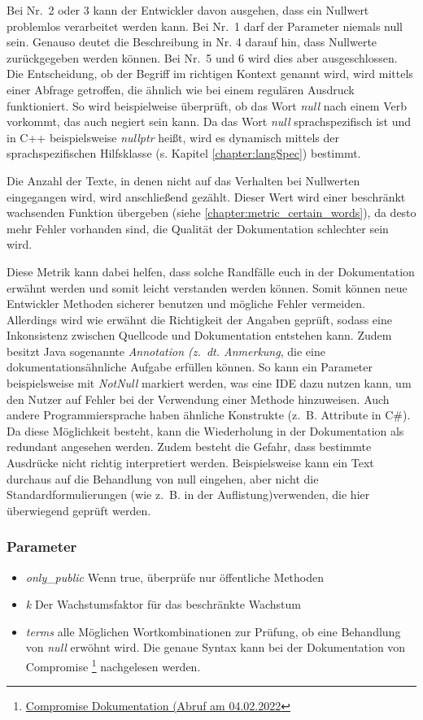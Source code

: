  Bei Nr.~2 oder 3 kann der Entwickler davon ausgehen, dass ein Nullwert problemlos verarbeitet werden kann. Bei Nr.~1 darf der Parameter niemals null sein.  Genauso deutet die Beschreibung in Nr. 4 darauf hin, dass Nullwerte zurückgegeben werden können. Bei Nr.~5 und 6 wird dies aber ausgeschlossen. Die Entscheidung, ob der Begriff im richtigen Kontext genannt wird, wird mittels einer Abfrage getroffen, die ähnlich wie bei einem regulären Ausdruck funktioniert. So wird beispielweise überprüft, ob das Wort \textit{null} nach einem Verb vorkommt, das auch negiert sein kann. Da das Wort \textit{null} sprachspezifisch ist und in C++ beispielsweise \textit{nullptr} heißt, wird es dynamisch mittels der sprachspezifischen Hilfsklasse (s. Kapitel \ref{chapter:langSpec}) bestimmt. 
 
 Die Anzahl der Texte, in denen nicht auf das Verhalten bei Nullwerten eingegangen wird, wird anschließend gezählt. Dieser Wert wird einer beschränkt wachsenden Funktion übergeben (siehe \ref{chapter:metric_certain_words}), da desto mehr Fehler vorhanden sind, die Qualität der Dokumentation schlechter sein wird. 
 
 Diese Metrik kann dabei helfen, dass solche Randfälle euch in der Dokumentation erwähnt werden und somit leicht verstanden werden können. Somit können neue Entwickler Methoden sicherer benutzen und mögliche Fehler vermeiden. Allerdings wird wie erwähnt die Richtigkeit der Angaben geprüft, sodass eine Inkonsistenz zwischen Quellcode und Dokumentation entstehen kann. Zudem besitzt Java sogenannte \textit{Annotation (z.~dt. Anmerkung}, die eine dokumentationsähnliche Aufgabe erfüllen können. So kann ein Parameter beispielsweise mit \textit{NotNull} markiert werden, was eine IDE dazu nutzen kann, um den Nutzer auf Fehler bei der Verwendung einer Methode hinzuweisen. Auch andere Programmiersprache haben ähnliche Konstrukte (z.~B. Attribute in C\#). Da diese Möglichkeit besteht, kann die Wiederholung in der Dokumentation als redundant angesehen werden. Zudem besteht die Gefahr, dass bestimmte Ausdrücke nicht richtig interpretiert werden. Beispielsweise kann ein Text durchaus auf die Behandlung von null eingehen, aber nicht die Standardformulierungen (wie z.~B. in der Auflistung)verwenden, die hier überwiegend geprüft werden.
 
   \subsubsection{Parameter}
\begin{itemize}
    \item \textit{only\_public} Wenn true,  überprüfe nur öffentliche Methoden
    \item \textit{k} Der Wachstumsfaktor für das beschränkte Wachstum
    
    \item \textit{terms} alle Möglichen Wortkombinationen zur Prüfung, ob eine Behandlung von \textit{null} erwöhnt wird. Die genaue Syntax kann bei der Dokumentation von Compromise \footnote{\href{https://observablehq.com/@spencermountain/compromise-match-syntax}{Compromise Dokumentation (Abruf am 04.02.2022}} nachgelesen werden.
    
\end{itemize}
 
